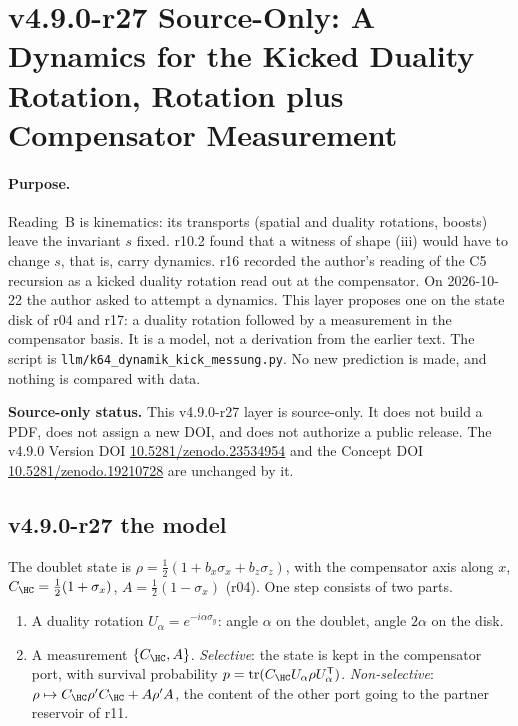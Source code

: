 \clearpage
\section*{v4.9.0-r27 Source-Only: A Dynamics for the Kicked Duality Rotation, Rotation plus Compensator Measurement}
\label{sec:v490-r27-kick-measurement-dynamics}

\paragraph{Purpose.}
Reading~B is kinematics: its transports (spatial and duality rotations, boosts) leave the invariant \(s\) fixed.  r10.2 found
that a witness of shape (iii) would have to change \(s\), that is, carry dynamics.  r16 recorded the author's reading of the C5
recursion as a kicked duality rotation read out at the compensator.  On 2026-10-22 the author asked to attempt a dynamics.  This
layer proposes one on the state disk of r04 and r17: a duality rotation followed by a measurement in the compensator basis.  It is
a model, not a derivation from the earlier text.  The script is \texttt{llm/k64\_dynamik\_kick\_messung.py}.  No new prediction is
made, and nothing is compared with data.

\noindent\textbf{Source-only status.}
This v4.9.0-r27 layer is source-only.  It does not build a PDF, does not assign a new DOI,
and does not authorize a public release.  The v4.9.0 Version DOI
\href{https://doi.org/10.5281/zenodo.23534954}{10.5281/zenodo.23534954} and the Concept DOI
\href{https://doi.org/10.5281/zenodo.19210728}{10.5281/zenodo.19210728} are unchanged by it.

\subsection*{v4.9.0-r27 the model}
\label{subsec:v490-r27-model}

The doublet state is \(\rho=\tfrac12(1+b_x\sigma_x+b_z\sigma_z)\), with the compensator axis along \(x\), \(C_{\HC}=\tfrac12(1+\sigma_x)\),
\(A=\tfrac12(1-\sigma_x)\) (r04).  One step consists of two parts.
\begin{enumerate}[leftmargin=2em]
\item A duality rotation \(U_\alpha=e^{-i\alpha\sigma_y}\): angle \(\alpha\) on the doublet, angle \(2\alpha\) on the disk.
\item A measurement \(\{C_{\HC},A\}\).  \emph{Selective}: the state is kept in the compensator port, with survival probability
\(p=\operatorname{tr}(C_{\HC}U_\alpha\rho U_\alpha^{\mathsf T})\).  \emph{Non-selective}: \(\rho\mapsto C_{\HC}\rho'C_{\HC}+A\rho'A\), the
content of the other port going to the partner reservoir of r11.
\end{enumerate}

